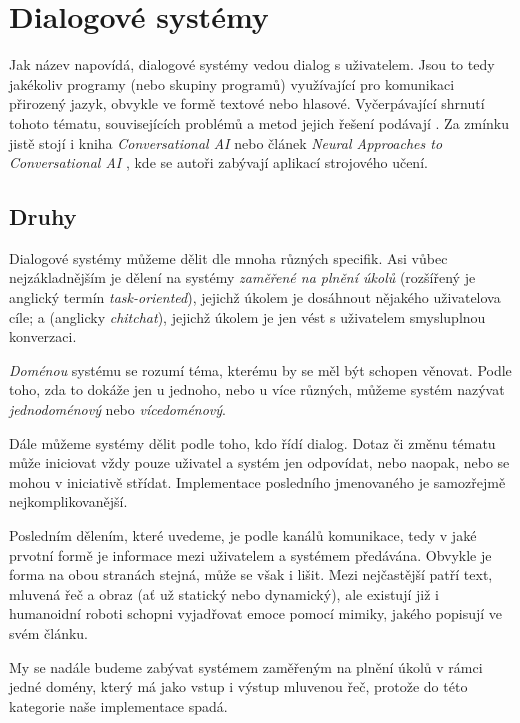 
\chapter{Dialogové systémy}

Jak název napovídá, dialogové systémy vedou dialog s uživatelem. Jsou to
tedy jakékoliv programy (nebo skupiny programů) využívající
pro komunikaci přirozený jazyk, obvykle ve formě textové nebo hlasové.
Vyčerpávající shrnutí tohoto tématu, souvisejících problémů a metod
jejich řešení podávají \citet{jurafsky_slp_2020}. Za zmínku jistě stojí
i kniha \textit{Conversational AI} \citep{mctear_conversational_2020} nebo
článek \textit{Neural Approaches to Conversational AI} \citep{gao_neural_2019},
kde se autoři zabývají aplikací strojového učení.

\section{Druhy}
Dialogové systémy můžeme dělit dle mnoha různých specifik. Asi vůbec
nejzákladnějším je dělení na systémy \textit{zaměřené na plnění úkolů}
(rozšířený je anglický termín \textit{task-oriented}), jejichž úkolem
je dosáhnout nějakého uživatelova cíle; a  (anglicky
\textit{chitchat}), jejichž úkolem je jen vést s uživatelem smysluplnou
konverzaci.

\textit{Doménou} systému se rozumí téma, kterému by se měl být schopen
věnovat. Podle toho, zda to dokáže jen u jednoho, nebo u více různých,
můžeme systém nazývat \textit{jednodoménový} nebo \textit{vícedoménový}.

Dále můžeme systémy dělit podle toho, kdo řídí dialog. Dotaz či změnu tématu
může iniciovat vždy pouze uživatel a systém jen odpovídat, nebo naopak, nebo
se mohou v iniciativě střídat. Implementace posledního jmenovaného je samozřejmě
nejkomplikovanější.

Posledním dělením, které uvedeme, je podle kanálů komunikace, tedy
v jaké prvotní formě je informace mezi uživatelem a systémem předávána.
Obvykle je forma na obou stranách stejná, může se však i lišit. Mezi
nejčastější patří text, mluvená řeč a obraz (ať už statický nebo
dynamický), ale existují již i humanoidní roboti schopni vyjadřovat emoce pomocí
mimiky, jakého popisují \citet{faraj_facially_2021} ve svém článku.

My se nadále budeme zabývat systémem zaměřeným na plnění úkolů v rámci jedné
domény, který má jako vstup i výstup mluvenou řeč, protože do této kategorie
naše implementace spadá.

